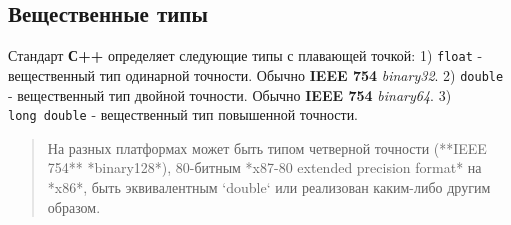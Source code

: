 \subsection{Вещественные типы}

Стандарт \textbf{С++} определяет следующие типы с плавающей точкой: 1)
\texttt{float} - вещественный тип одинарной точности. Обычно
\textbf{IEEE 754} \emph{binary32}. 2) \texttt{double} - вещественный тип
двойной точности. Обычно \textbf{IEEE 754} \emph{binary64}. 3)
\texttt{long\ double} - вещественный тип повышенной точности.

\begin{quote}
На разных платформах может быть типом четверной точности (**IEEE 754** *binary128*), 80-битным *x87-80 extended precision format* на *x86*, быть эквивалентным `double` или реализован каким-либо другим образом.
\end{quote}
